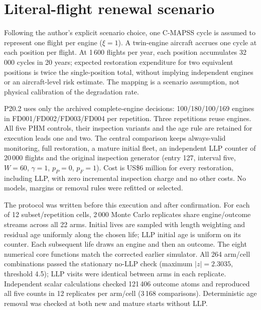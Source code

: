 \documentclass[12pt]{article}
\begin{document}
\section{Literal-flight renewal scenario}

Following the author's explicit scenario choice, one C-MAPSS cycle is assumed to represent one flight per engine ($\xi=1$). A twin-engine aircraft accrues one cycle at each position per flight. At 1\,600 flights per year, each position accumulates 32\,000 cycles in 20 years; expected restoration expenditure for two equivalent positions is twice the single-position total, without implying independent engines or an aircraft-level risk estimate. The mapping is a scenario assumption, not physical calibration of the degradation rate.

P20.2 uses only the archived complete-engine decisions: 100/180/100/169 engines in FD001/FD002/FD003/FD004 per repetition. Three repetitions reuse engines. All five PHM controls, their inspection variants and the age rule are retained for execution leads one and two. The central comparison keeps always-valid monitoring, full restoration, a mature initial fleet, an independent LLP counter of 20\,000 flights and the original inspection generator (entry 127, interval five, $W=60$, $\gamma=1$, $p_P=0$, $p_F=1$). Cost is US\$6 million for every restoration, including LLP, with zero incremental inspection charge and no other costs. No models, margins or removal rules were refitted or selected.

The protocol was written before this execution and after confirmation. For each of 12 subset/repetition cells, 2\,000 Monte Carlo replicates share engine/outcome streams across all 22 arms. Initial lives are sampled with length weighting and residual age uniformly along the chosen life; LLP initial age is uniform on its counter. Each subsequent life draws an engine and then an outcome. The eight numerical core functions match the corrected earlier simulator. All 264 arm/cell combinations passed the stationary no-LLP check (maximum $|z|=2.3035$, threshold 4.5); LLP visits were identical between arms in each replicate. Independent scalar calculations checked 121\,406 outcome atoms and reproduced all five counts in 12 replicates per arm/cell (3\,168 comparisons). Deterministic age removal was checked at both new and mature starts without LLP.
\end{document}
